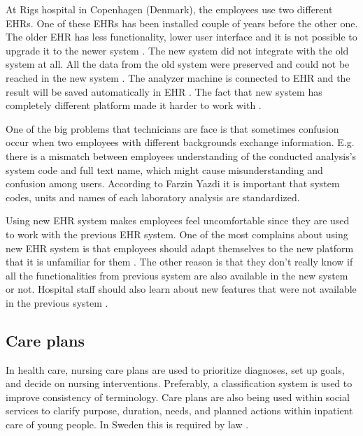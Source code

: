\documentclass[14pt]{article}
\begin{document}
At Rigs hospital in Copenhagen (Denmark), the employees use two different \glspl{EHR}. One of these \glspl{EHR} has been installed couple of years before the other one. The older \gls{EHR} has less functionality, lower user interface and it is not possible to upgrade it to the newer system \cite{FarzinYazdi}. The new system did not integrate with the old system at all. All the data from the old system were preserved and could not be reached in the new system \cite{FarzinYazdi}. The analyzer machine is connected to \gls{EHR} and the result will be saved automatically in \gls{EHR} \cite{FarzinYazdi}. The fact that new system has completely different platform made it harder to work with \cite{FarzinYazdi}.

One of the big problems that technicians are face is that sometimes confusion occur when two employees with different backgrounds exchange information. E.g. there is a mismatch between employees understanding of the conducted analysis's system code and full text name, which might cause misunderstanding and confusion among users\cite{FarzinYazdi}. According to Farzin Yazdi\cite{FarzinYazdi} it is important that system codes, units and names of each laboratory analysis are standardized.

Using new \gls{EHR} system makes employees feel uncomfortable since they are used to work with the previous \gls{EHR} system. One of the most complains about using new \gls{EHR} system is that employees should adapt themselves to the new platform that it is unfamiliar for them \cite{FarzinYazdi}. The other reason is that they don’t really know if all the functionalities from previous system are also available in the new system or not. Hospital staff should also learn about new features that were not available in the previous system \cite{FarzinYazdi}.
\label{sec:techMotiv}

\subsection{Care plans}
\label{sec:interopPlans}
In health care, nursing care plans are used to prioritize diagnoses, set up goals, and decide on nursing interventions. Preferably, a classification system is used to improve consistency of terminology. Care plans are also being used within social services to clarify purpose, duration, needs, and planned actions within inpatient care of young people. In Sweden this is required by law \cite{SocialServices}.
\end{document}
